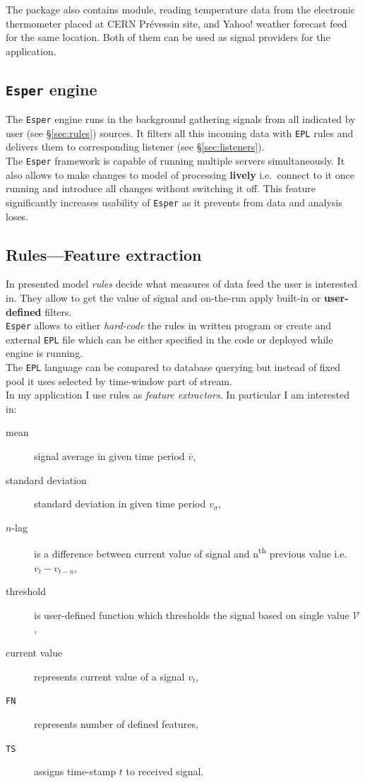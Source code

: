 \documentclass[11pt, letterpaper]{article}            %
\newcommand{\ts}{\textsuperscript}
\begin{document}
The package also contains module, reading temperature data from the electronic thermometer placed at CERN Prévessin site, and Yahoo! weather forecast feed for the same location. Both of them can be used as signal providers for the application.

\subsection{\texttt{Esper} engine}
The \texttt{Esper} engine runs in the background gathering signals from all indicated by user (see §\ref{sec:rules}) sources. It filters all this incoming data with \texttt{EPL} rules and delivers them to corresponding listener (see §\ref{sec:listeners}).\\
The \texttt{Esper} framework is capable of running multiple servers simultaneously. It also allows to make changes to model of processing \textbf{lively} i.e.\ connect to it once running and introduce all changes without switching it off. This feature significantly increases usability of \texttt{Esper} as it prevents from data and analysis loses.\\

\subsection{Rules---Feature extraction\label{sec:rules}}
In presented model \emph{rules} decide what measures of data feed the user is interested in. They allow to get the value of signal and on-the-run apply built-in or \textbf{user-defined} filters.\\
\texttt{Esper} allows to either \emph{hard-code} the rules in written program or create and external \texttt{EPL} file which can be either specified in the code or deployed while engine is running.\\
The \texttt{EPL} language can be compared to database querying but instead of fixed pool it uses selected by time-window part of stream.\\

In my application I use rules as \emph{feature extractors}. In particular I am interested in:
\begin{description}
  \item[mean] signal average in given time period $\bar{v}$,
  \item[standard deviation] standard deviation in given time period $v_\sigma$,
  \item[$n$-lag] is a difference between current value of signal and n\ts{th} previous value i.e.\ $v_t - v_{t-n}$,
  \item[threshold] is user-defined function which thresholds the signal based on single value $\mathscr{V}$,
  \item[current value] represents current value of a signal $v_t$,
  \item[\texttt{FN}] represents number of defined features,
  \item[\texttt{TS}] assigns time-stamp $t$ to received signal.
\end{description}
\end{document}
